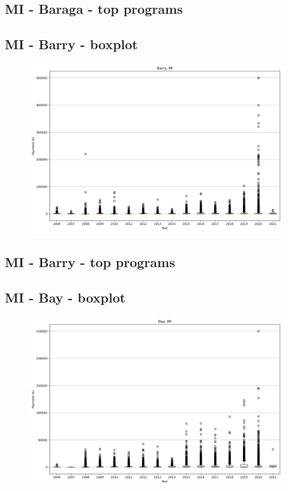 \subsection*{MI - Baraga - top programs}

\newpage
\subsection*{MI - Barry - boxplot}
\begin{figure}[h]
\centering
\includegraphics[width=7in]{../output/boxplots/counties/Barry-MI_boxplot.png}
\end{figure}


\subsection*{MI - Barry - top programs}

\newpage
\subsection*{MI - Bay - boxplot}
\begin{figure}[h]
\centering
\includegraphics[width=7in]{../output/boxplots/counties/Bay-MI_boxplot.png}
\end{figure}


